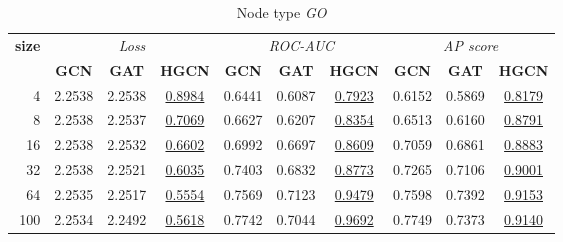 \begin{table}
    \begin{subtable}[t]{\textwidth}
        \centering
        \begin{tabular}{r|ccc|ccc|ccc}   
             \toprule
                \multirow{2}{*}{\textbf{size}} & \multicolumn{3}{c|}{\textit{Loss}} & \multicolumn{3}{c|}{\textit{ROC-AUC}} & \multicolumn{3}{c}{\textit{AP score}} \\
                & \textbf{GCN} & \textbf{GAT} & \textbf{HGCN} & \textbf{GCN} & \textbf{GAT} & \textbf{HGCN} & \textbf{GCN} & \textbf{GAT} & \textbf{HGCN} \\
                \midrule
                4 & 2.2538 & 2.2538 & \underline{0.8984} & 0.6441 & 0.6087 & \underline{0.7923} & 0.6152 & 0.5869 & \underline{0.8179} \\
                8 & 2.2538 & 2.2537 & \underline{0.7069} & 0.6627 & 0.6207 & \underline{0.8354} & 0.6513 & 0.6160 & \underline{0.8791} \\
                16 & 2.2538 & 2.2532 & \underline{0.6602} & 0.6992 & 0.6697 & \underline{0.8609} & 0.7059 & 0.6861 & \underline{0.8883} \\
                32 & 2.2538 & 2.2521 & \underline{0.6035} & 0.7403 & 0.6832 & \underline{0.8773} & 0.7265 & 0.7106 & \underline{0.9001} \\
                64 & 2.2535 & 2.2517 & \underline{0.5554} & 0.7569 & 0.7123 & \underline{0.9479} & 0.7598 & 0.7392 & \underline{0.9153} \\
                100 & 2.2534 & 2.2492 & \underline{0.5618} & 0.7742 & 0.7044 & \underline{0.9692} & 0.7749 & 0.7373 & \underline{0.9140} \\
                \bottomrule
        \end{tabular}
        \caption{Node type \textit{GO}}
    \end{subtable}
    
    \vspace{1em}
    

\end{table}
